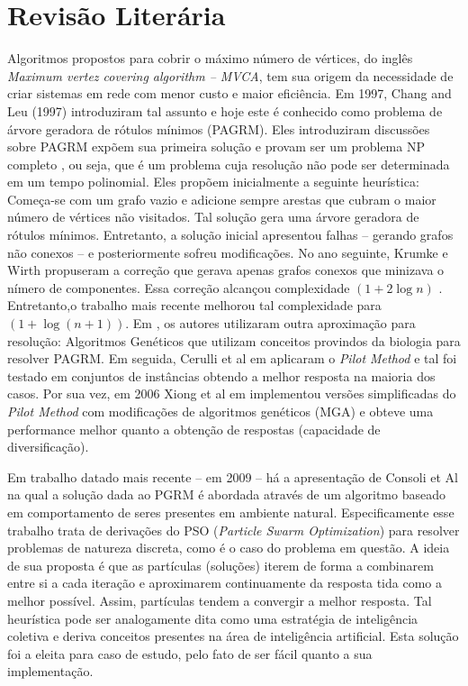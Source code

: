 \documentclass{sig-alternate-05-2015}
\begin{document}
\section{Revisão Literária} \label{sec2}
Algoritmos propostos para cobrir o máximo número de vértices, do inglês \textit{Maximum vertez covering algorithm -- MVCA}, tem sua origem da necessidade de
criar sistemas em rede com menor custo e maior eficiência. Em 1997, Chang and Leu (1997) \cite{chang1997minimum} introduziram tal assunto e hoje este é conhecido
como problema de árvore geradora de rótulos mínimos (PAGRM).
Eles introduziram discussões sobre PAGRM expõem  sua primeira solução e provam ser um problema NP completo \cite{Ladner:1975:SPT:321864.321877}, ou seja, que
é um problema cuja resolução não pode ser determinada em um tempo polinomial. Eles propõem inicialmente a seguinte heurística: Começa-se com um grafo vazio e adicione
sempre arestas que cubram o maior número de vértices não visitados. Tal solução gera uma árvore geradora de rótulos mínimos. Entretanto, a solução inicial
apresentou falhas -- gerando grafos não conexos -- e posteriormente sofreu modificações.
No ano seguinte, Krumke e Wirth \cite{krumke1998minimum} propuseram a correção que gerava apenas grafos conexos que minizava o nímero de componentes. Essa correção
alcançou complexidade $(1 + 2 \log{n})$ . Entretanto,o trabalho mais recente \cite{wan2002note} melhorou tal complexidade para $ ( 1 + \log {(n + 1)}) $.
Em \cite{xiong2005one}, os autores utilizaram outra aproximação para resolução:
Algoritmos Genéticos que utilizam conceitos provindos da biologia para resolver
PAGRM. Em seguida, Cerulli et al em \cite{cerulli2005metaheuristics} aplicaram o \textit{Pilot Method} e tal foi testado em conjuntos de instâncias obtendo a melhor
resposta na maioria dos casos. Por sua vez, em 2006 Xiong et al em \cite{xiong2006improved} implementou versões simplificadas do \textit{Pilot Method} com modificações
de algoritmos genéticos (MGA) e obteve uma performance melhor quanto a obtenção de respostas (capacidade de diversificação).

Em trabalho datado mais recente \cite{consoli2008discrete} -- em 2009 --  há a apresentação de Consoli et Al na qual a solução dada ao PGRM é abordada através de um algoritmo baseado em comportamento de seres presentes em ambiente natural. Especificamente esse trabalho trata de derivações do PSO (\textit{Particle Swarm Optimization}) para resolver problemas de natureza discreta, como é o caso do problema em questão. A ideia de sua proposta é que as partículas (soluções) iterem de forma a combinarem entre si a cada iteração e aproximarem continuamente da resposta tida como a melhor possível. Assim, partículas tendem a convergir a melhor resposta. Tal heurística pode ser analogamente dita como uma estratégia de inteligência coletiva e deriva conceitos presentes na área de inteligência artificial. Esta solução foi a eleita para caso de estudo, pelo fato de ser fácil quanto a sua implementação. 
\end{document}
